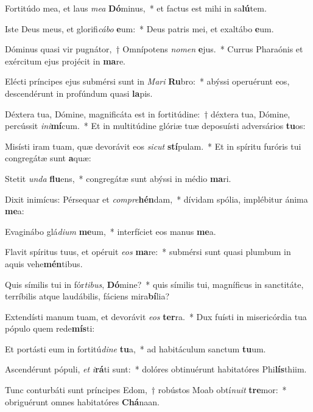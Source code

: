 \item Fortitúdo mea, et laus \textit{me}\textit{a} \textbf{Dó}minus,~* et factus est mihi in sa\textbf{lú}tem.
\item Iste Deus meus, et glorifi\textit{cá}\textit{bo} \textbf{e}um:~* Deus patris mei, et exaltábo \textbf{e}um.
\item Dóminus quasi vir pugnátor,~† Omnípotens \textit{no}\textit{men} \textbf{e}jus.~* Currus Pharaónis et exércitum ejus projécit in \textbf{ma}re.
\item Elécti príncipes ejus submérsi sunt in \textit{Ma}\textit{ri} \textbf{Ru}bro:~* abýssi operuérunt eos, descendérunt in profúndum quasi \textbf{la}pis.
\item Déxtera tua, Dómine, magnificáta est in fortitúdine:~† déxtera tua, Dómine, percússit \textit{in}\textit{i}\textbf{mí}cum.~* Et in multitúdine glóriæ tuæ deposuísti adversários \textbf{tu}os:
\item Misísti iram tuam, quæ devorávit eos \textit{sic}\textit{ut} \textbf{stí}pulam.~* Et in spíritu furóris tui congregátæ sunt \textbf{a}quæ:
\item Stetit \textit{un}\textit{da} \textbf{flu}ens,~* congregátæ sunt abýssi in médio \textbf{ma}ri.
\item Dixit inimícus: Pérsequar et \textit{com}\textit{pre}\textbf{hén}dam,~* dívidam spólia, implébitur ánima \textbf{me}a:
\item Evaginábo glá\textit{di}\textit{um} \textbf{me}um,~* interfíciet eos manus \textbf{me}a.
\item Flavit spíritus tuus, et opéruit \textit{e}\textit{os} \textbf{ma}re:~* submérsi sunt quasi plumbum in aquis vehe\textbf{mén}tibus.
\item Quis símilis tui in fór\textit{ti}\textit{bus}, \textbf{Dó}mine?~* quis símilis tui, magníficus in sanctitáte, terríbilis atque laudábilis, fáciens mira\textbf{bí}lia?
\item Extendísti manum tuam, et devorávit \textit{e}\textit{os} \textbf{ter}ra.~* Dux fuísti in misericórdia tua pópulo quem rede\textbf{mís}ti:
\item Et portásti eum in fortitú\textit{di}\textit{ne} \textbf{tu}a,~* ad habitáculum sanctum \textbf{tu}um.
\item Ascendérunt pópuli, \textit{et} \textit{i}\textbf{rá}ti sunt:~* dolóres obtinuérunt habitatóres Phi\textbf{lís}thiim.
\item Tunc conturbáti sunt príncipes Edom,~† robústos Moab obtí\textit{nu}\textit{it} \textbf{tre}mor:~* obriguérunt omnes habitatóres \textbf{Chá}naan.
